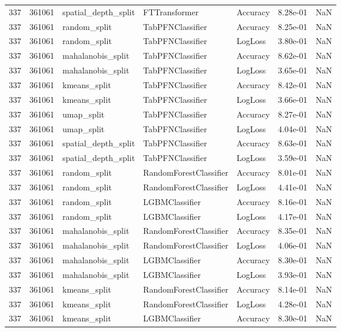 \begin{tabular}{rrlllrr}
337 & 361061 & spatial\_depth\_split & FTTransformer & Accuracy & 8.28e-01 & NaN \\
337 & 361061 & random\_split & TabPFNClassifier & Accuracy & 8.25e-01 & NaN \\
337 & 361061 & random\_split & TabPFNClassifier & LogLoss & 3.80e-01 & NaN \\
337 & 361061 & mahalanobis\_split & TabPFNClassifier & Accuracy & 8.62e-01 & NaN \\
337 & 361061 & mahalanobis\_split & TabPFNClassifier & LogLoss & 3.65e-01 & NaN \\
337 & 361061 & kmeans\_split & TabPFNClassifier & Accuracy & 8.42e-01 & NaN \\
337 & 361061 & kmeans\_split & TabPFNClassifier & LogLoss & 3.66e-01 & NaN \\
337 & 361061 & umap\_split & TabPFNClassifier & Accuracy & 8.27e-01 & NaN \\
337 & 361061 & umap\_split & TabPFNClassifier & LogLoss & 4.04e-01 & NaN \\
337 & 361061 & spatial\_depth\_split & TabPFNClassifier & Accuracy & 8.63e-01 & NaN \\
337 & 361061 & spatial\_depth\_split & TabPFNClassifier & LogLoss & 3.59e-01 & NaN \\
337 & 361061 & random\_split & RandomForestClassifier & Accuracy & 8.01e-01 & NaN \\
337 & 361061 & random\_split & RandomForestClassifier & LogLoss & 4.41e-01 & NaN \\
337 & 361061 & random\_split & LGBMClassifier & Accuracy & 8.16e-01 & NaN \\
337 & 361061 & random\_split & LGBMClassifier & LogLoss & 4.17e-01 & NaN \\
337 & 361061 & mahalanobis\_split & RandomForestClassifier & Accuracy & 8.35e-01 & NaN \\
337 & 361061 & mahalanobis\_split & RandomForestClassifier & LogLoss & 4.06e-01 & NaN \\
337 & 361061 & mahalanobis\_split & LGBMClassifier & Accuracy & 8.30e-01 & NaN \\
337 & 361061 & mahalanobis\_split & LGBMClassifier & LogLoss & 3.93e-01 & NaN \\
337 & 361061 & kmeans\_split & RandomForestClassifier & Accuracy & 8.14e-01 & NaN \\
337 & 361061 & kmeans\_split & RandomForestClassifier & LogLoss & 4.28e-01 & NaN \\
337 & 361061 & kmeans\_split & LGBMClassifier & Accuracy & 8.30e-01 & NaN \\

\end{tabular}
